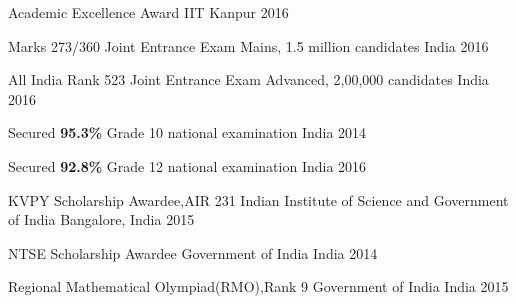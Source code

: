 
\vspace{-0.3cm}



\begin{cvhonors}


  \cvhonor
  {Academic Excellence Award} %
  {} %
  {IIT Kanpur} %
  {2016} %


  \cvhonor
  {Marks 273/360} %
  {Joint Entrance Exam Mains, 1.5 million candidates} %
  {India} %
  {2016} %


  \cvhonor
  {All India Rank 523} %
  {Joint Entrance Exam Advanced, 2,00,000 candidates} %
  {India} %
  {2016} %

  \cvhonor
  {Secured \textbf{95.3\%}}
  {Grade 10 national examination}
  {India}
  {2014}

  \cvhonor
  {Secured \textbf{92.8\%}}
  {Grade 12 national examination}
  {India}
  {2016}
  
  \cvhonor
  {KVPY Scholarship Awardee,AIR 231}
  {Indian Institute of Science and Government of India}
  {Bangalore, India}
  {2015}

  \cvhonor
  {NTSE Scholarship Awardee}
  {Government of India}
  {India}
  {2014}
  
  \cvhonor
  {Regional Mathematical Olympiad(RMO),Rank 9}
  {Government of India}
  {India}
  {2015}


\end{cvhonors}


